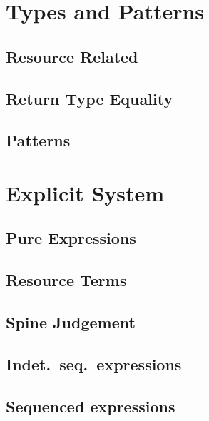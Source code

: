 \documentclass[11pt]{article}%
\begin{document}
\raggedright%

\section{Types and Patterns}

\subsection{Resource Related}
\cndefnsresXXjudge%

\subsection{Return Type Equality}
\cndefnsretXXjudge%

\subsection{Patterns}
\cndefnspatXXjudge%

\section{Explicit System}

\subsection{Pure Expressions}
\cndefnsexplXXpure%

\subsection{Resource Terms}
\cndefnsexplXXres%

\subsection{Spine Judgement}
\cndefnsexplXXspine%

\subsection{Indet.\ seq.\ expressions}
\cndefnsexplXXisXXexpr%

\subsection{Sequenced expressions}
\cndefnsexplXXseqXXexpr%
\end{document}
